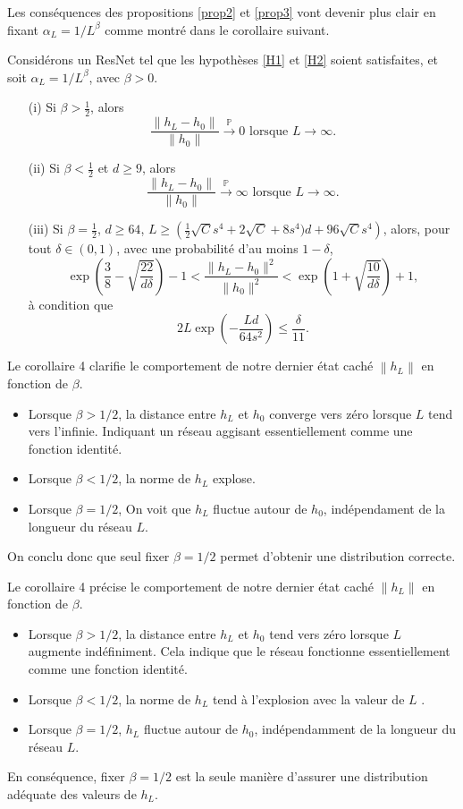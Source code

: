 Les conséquences des propositions \ref{prop2} et \ref{prop3} vont devenir plus clair en fixant $ \alpha _L = 1/L ^\beta $ comme montré dans le corollaire suivant.
\begin{cor}\label{cor4}
    Considérons un ResNet \cite{torchvision2016} tel que les hypothèses \ref{H1} et \ref{H2} soient satisfaites, et soit $ \alpha_L = 1/L^\beta $, avec $ \beta > 0 $.
    \begin{itemize}
        \item[(i)] Si $ \beta > \frac{1}{2} $, alors
        \[
            \frac{\|h_L - h_0\|}{\|h_0\|} \xrightarrow{\mathbb{P}} 0 \text{ lorsque } L \to \infty.
        \]
        \item[(ii)] Si $ \beta < \frac{1}{2}$ et $d \geq 9 $, alors
        \[
            \frac{\|h_L - h_0\|}{\|h_0\|} \xrightarrow{\mathbb{P}} \infty \text{ lorsque } L \to \infty.
        \]
        \item[(iii)] Si $ \beta = \frac{1}{2} $, $ d \geq 64$, $L \geq \left(\frac{1}{2}\sqrt{C}s^4 + 2\sqrt{C} + 8s^4)d + 96\sqrt{C}s^4\right) $, alors, pour tout $ \delta \in (0, 1) $, avec une probabilité d'au moins $ 1 - \delta $,
        \[
            \exp\left(\frac{3}{8} - \sqrt{\frac{22}{d\delta}}\right) - 1 < \frac{\|h_L - h_0\|^2}{\|h_0\|^2} < \exp\left(1 + \sqrt{\frac{10}{d\delta}}\right) + 1,
        \]
        à condition que
        \[
            2L \exp\left(-\frac{Ld}{64s^2}\right) \leq \frac{\delta}{11}.
        \]
    \end{itemize}
\end{cor}
Le corollaire 4 clarifie le comportement de notre dernier état caché $ \left\| h_L \right\|  $  en fonction de $ \beta  $. 
\begin{itemize}
    \item Lorsque $ \beta > 1/2 $, la distance entre $ h_L $ et $ h_0 $ converge vers zéro lorsque $ L $ tend vers l'infinie. Indiquant un réseau aggisant essentiellement comme une fonction identité.
    \item Lorsque $ \beta < 1/2 $, la norme de $ h_L $ explose.
    \item Lorsque $ \beta = 1/2 $, On voit que $ h_L $ fluctue autour de $ h_0 $, indépendament de la longueur du réseau $ L $.
\end{itemize}
On conclu donc que seul fixer $ \beta = 1/2 $ permet d'obtenir une distribution correcte.

Le corollaire 4 précise le comportement de notre dernier état caché $\left\| h_L \right\|$ en fonction de $\beta$.
\begin{itemize}
    \item Lorsque $\beta > 1/2$, la distance entre $h_L$ et $h_0$ tend vers zéro lorsque $L$ augmente indéfiniment. Cela indique que le réseau fonctionne essentiellement comme une fonction identité.
    \item Lorsque $\beta < 1/2$, la norme de $h_L$ tend à l'explosion avec la valeur de $ L $ .
    \item Lorsque $\beta = 1/2$, $h_L$ fluctue autour de $h_0$, indépendamment de la longueur du réseau $L$.
\end{itemize}
En conséquence, fixer $\beta = 1/2$ est la seule manière d'assurer une distribution adéquate des valeurs de $h_L$.


